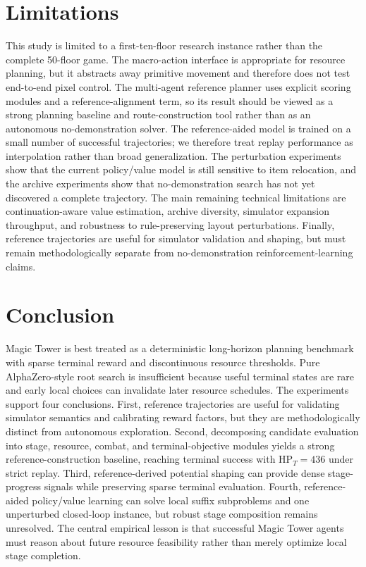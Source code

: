 \documentclass{article}
\begin{document}
\section{Limitations}
This study is limited to a first-ten-floor research instance rather than the
complete 50-floor game.  The macro-action interface is appropriate for resource
planning, but it abstracts away primitive movement and therefore does not test
end-to-end pixel control.  The multi-agent reference planner uses explicit
scoring modules and a reference-alignment term, so its result should be viewed
as a strong planning baseline and route-construction tool rather than as an
autonomous no-demonstration solver.  The reference-aided model is trained on a
small number of successful trajectories; we therefore treat replay performance
as interpolation rather than broad generalization.  The perturbation experiments
show that the current policy/value model is still sensitive to item relocation,
and the archive experiments show that no-demonstration search has not yet
discovered a complete trajectory.  The main remaining technical limitations are
continuation-aware value estimation, archive diversity, simulator expansion
throughput, and robustness to rule-preserving layout perturbations.  Finally,
reference trajectories are useful for simulator validation and shaping, but must
remain methodologically separate from no-demonstration reinforcement-learning
claims.

\section{Conclusion}
Magic Tower is best treated as a deterministic long-horizon planning benchmark
with sparse terminal reward and discontinuous resource thresholds.  Pure
AlphaZero-style root search is insufficient because useful terminal states are
rare and early local choices can invalidate later resource schedules.  The
experiments support four conclusions.  First, reference trajectories are useful
for validating simulator semantics and calibrating reward factors, but they are
methodologically distinct from autonomous exploration.  Second, decomposing
candidate evaluation into stage, resource, combat, and terminal-objective
modules yields a strong reference-construction baseline, reaching terminal
success with \(\mathrm{HP}_T=436\) under strict replay.  Third,
reference-derived potential shaping can provide dense stage-progress signals
while preserving sparse terminal evaluation.  Fourth, reference-aided
policy/value learning can solve local suffix subproblems and one unperturbed
closed-loop instance, but robust stage composition remains unresolved.  The
central empirical lesson is that successful Magic Tower agents must reason about
future resource feasibility rather than merely optimize local stage completion.



\end{document}
